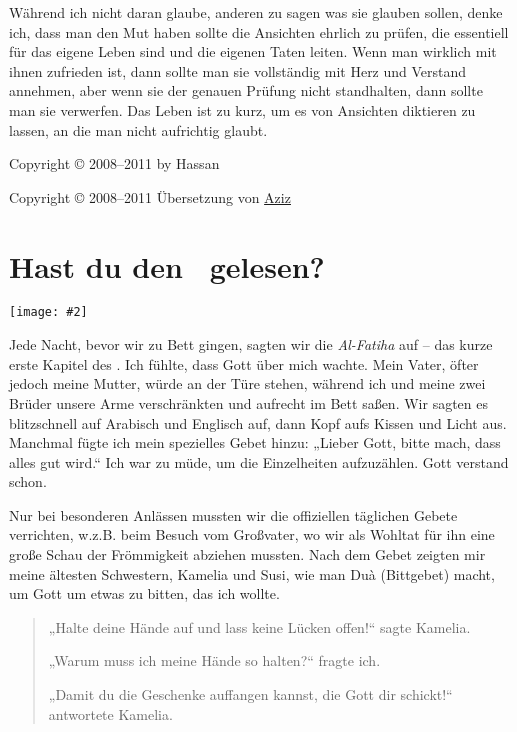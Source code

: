 \documentclass[12pt]{memoir}
\newcommand{\img}[3]{\begin{center}%
\texttt{[image: \#2]}\\{\small\em#3}%
\end{center}}
\begin{document}
Während ich nicht daran glaube, anderen zu sagen was sie glauben sollen,
denke ich, dass man den Mut haben sollte die Ansichten ehrlich zu prüfen,
die essentiell für das eigene Leben sind und die eigenen Taten leiten.
Wenn man wirklich mit ihnen zufrieden ist,
dann sollte man sie vollständig mit Herz und Verstand annehmen,
aber wenn sie der genauen Prüfung nicht standhalten,
dann sollte man sie verwerfen.
Das Leben ist zu kurz, um es von Ansichten diktieren zu lassen,
an die man nicht aufrichtig glaubt.

\hfill Copyright © 2008–2011 by Hassan

\hfill Copyright © 2008–2011 Übersetzung von
\href{mailto:alsana.aziz@gmail.com}{Aziz}

\mainmatter


\chapter{Hast du den \Quran\ gelesen?}

\img{scale=0.7}{Baby_Hassan.jpg}{}

Jede Nacht, bevor wir zu Bett gingen, sagten wir die \emph{Al-Fatiha} auf –
das kurze erste Kapitel des \Quran.
Ich fühlte, dass Gott über mich wachte.
Mein Vater, öfter jedoch meine Mutter, würde an der Türe stehen,
während ich und meine zwei Brüder unsere Arme verschränkten
und aufrecht im Bett saßen.
Wir sagten es blitzschnell auf Arabisch und Englisch auf,
dann Kopf aufs Kissen und Licht aus.
Manchmal fügte ich mein spezielles Gebet hinzu:
„Lieber Gott, bitte mach, dass alles gut wird.“
Ich war zu müde, um die Einzelheiten aufzuzählen.
Gott verstand schon.

Nur bei besonderen Anlässen mussten wir
die offiziellen täglichen Gebete verrichten,
w.z.B. beim Besuch vom Großvater,
wo wir als Wohltat für ihn eine große Schau der Frömmigkeit abziehen mussten.
Nach dem Gebet zeigten mir meine ältesten Schwestern, Kamelia und Susi,
wie man Du\`a (Bittgebet) macht, um Gott um etwas zu bitten, das ich wollte.

\begin{quote}
„Halte deine Hände auf und lass keine Lücken offen!“ sagte Kamelia.

„Warum muss ich meine Hände so halten?“ fragte ich.

„Damit du die Geschenke auffangen kannst, die Gott dir schickt!“
antwortete Kamelia.
\end{quote}
\end{document}
